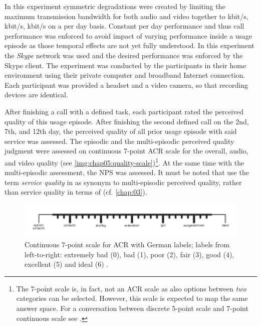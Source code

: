 In this experiment symmetric degradations were created by limiting the maximum transmission bandwidth for both audio and video together to \unit[500]{kbit/s}, \unit[150]{kbit/s}, \unit[32]{kbit/s} on a per day basis.
Constant per day performance and thus call performance was enforced to avoid impact of varying performance inside a usage episode as those temporal effects are not yet fully understood.
In this experiment the \emph{Skype} network was used and the desired performance was enforced by the Skype client.
The experiment was conducted by the participants in their home environment using their private computer and broadband Internet connection.
Each participant was provided a headset and a video camera, so that recording devices are identical.

After finishing a call with a defined task, each participant rated the perceived quality of this usage episode.
After finishing the second defined call on the 2nd, 7th, and 12th day, the perceived quality of all prior usage episode with said service was assessed.
The episodic and the multi-episodic perceived quality judgment were assessed on continuous 7-point \ac{ACR} scale \citep[cf.][p. 19]{itu-t_p.851:_2003} for the overall, audio, and video quality (see \autoref{img:chap05:quality-scale})\footnote{The 7-point scale is, in fact, not an \ac{ACR} scale as also options between \emph{two} categories can be selected. However, this scale is expected to map the same answer space. For a conversation between discrete 5-point scale and 7-point continuous scale see \cite{koster_comparison_2015}.}.
At the same time with the multi-episodic assessment, the \ac{NPS} was assessed.
It must be noted that \cite{moller_single-call_2011} use the term \emph{service quality} in as synonym to multi-episodic perceived quality, rather than service quality in terms of \cite{parasuraman_conceptual_1985} (cf. \autoref{chap:03}).

\begin{figure}[h]
	\includegraphics[width=1\textwidth]{fig/quality7pt_scale}
	\caption{Continuous 7-point scale for \ac{ACR} with German labels; labels from left-to-right: extremely bad (0), bad (1), poor (2), fair (3), good (4), excellent (5) and ideal (6) \citep{itu-t_p.805:_2007}.}
	\label{img:chap05:quality-scale}
\end{figure}

